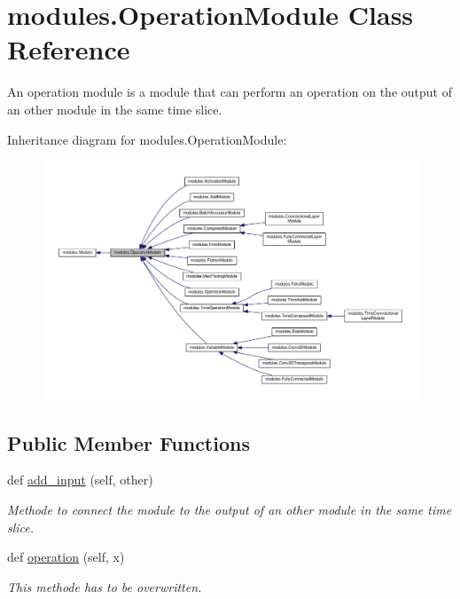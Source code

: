 \hypertarget{classmodules_1_1_operation_module}{}\section{modules.\+Operation\+Module Class Reference}
\label{classmodules_1_1_operation_module}


An operation module is a module that can perform an operation on the output of an other module in the same time slice.  




Inheritance diagram for modules.\+Operation\+Module\+:\nopagebreak
\begin{figure}[H]
\begin{center}
\leavevmode
\includegraphics[width=350pt]{classmodules_1_1_operation_module__inherit__graph}
\end{center}
\end{figure}
\subsection*{Public Member Functions}
\begin{DoxyCompactItemize}
\item 
def \hyperlink{classmodules_1_1_operation_module_a781d6ef84166df2f1b08abb324d1f7c8}{add\+\_\+input} (self, other)
\begin{DoxyCompactList}\small\item\em Methode to connect the module to the output of an other module in the same time slice. \end{DoxyCompactList}\item 
\mbox{\label{classmodules_1_1_operation_module_ac548115acd3c707e9989ab3cf3ece25b}} 
def \hyperlink{classmodules_1_1_operation_module_ac548115acd3c707e9989ab3cf3ece25b}{operation} (self, x)
\begin{DoxyCompactList}\small\item\em This methode has to be overwritten. \end{DoxyCompactList}\end{DoxyCompactItemize}

